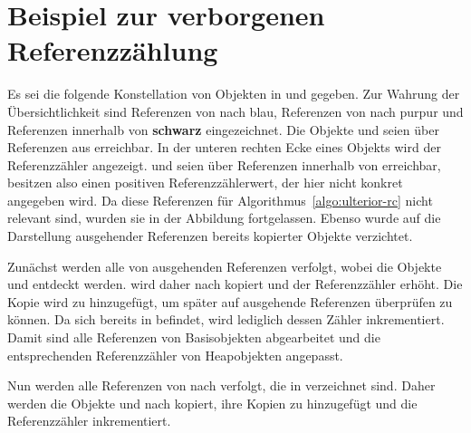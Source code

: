 \chapter{Beispiel zur verborgenen Referenzzählung}
\label{cha:ulterior-example}

Es sei die folgende Konstellation von Objekten in \Nursery und \Mature gegeben.
Zur Wahrung der Übersichtlichkeit sind Referenzen von \Nursery nach \Mature \textcolor{ctcolormain}{blau}, Referenzen von \Mature nach \Nursery \textcolor{ctcoloraccessory}{purpur} und Referenzen innerhalb von \Nursery \textbf{schwarz} eingezeichnet.
Die Objekte  und  seien über Referenzen aus \Roots erreichbar.
In der unteren rechten Ecke eines Objekts wird der Referenzzähler angezeigt.
 und  seien über Referenzen innerhalb von \Mature erreichbar, besitzen also einen positiven Referenzzählerwert, der hier nicht konkret angegeben wird.
Da diese Referenzen für Algorithmus~\ref{algo:ulterior-rc} nicht relevant sind, wurden sie in der Abbildung fortgelassen.
Ebenso wurde auf die Darstellung ausgehender Referenzen bereits kopierter Objekte verzichtet.

\begin{center}
	
\end{center}

Zunächst werden alle von \Roots ausgehenden Referenzen verfolgt, wobei die Objekte  und  entdeckt werden.
 wird daher nach \Mature kopiert und der Referenzzähler erhöht.
Die Kopie  wird zu  hinzugefügt, um später  auf ausgehende Referenzen überprüfen zu können.
Da sich  bereits in \Mature befindet, wird lediglich dessen Zähler inkrementiert.
Damit sind alle Referenzen von Basisobjekten abgearbeitet und die entsprechenden Referenzzähler von Heapobjekten angepasst.

\begin{center}
	
\end{center}

Nun werden alle Referenzen von \Mature nach \Nursery verfolgt, die in  verzeichnet sind.
Daher werden die Objekte  und  nach \Mature kopiert, ihre Kopien zu  hinzugefügt und die Referenzzähler inkrementiert.

\begin{center}
	
	
	
\end{center}

